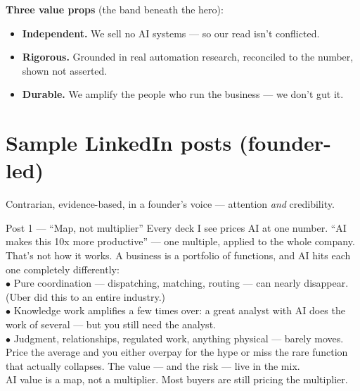 \documentclass[11pt]{article}
\begin{document}
\textbf{Three value props} (the band beneath the hero):
\begin{itemize}
  \item \textbf{Independent.} We sell no AI systems --- so our read isn't conflicted.
  \item \textbf{Rigorous.} Grounded in real automation research, reconciled to the number, shown not asserted.
  \item \textbf{Durable.} We amplify the people who run the business --- we don't gut it.
\end{itemize}

\section{Sample LinkedIn posts (founder-led)}
Contrarian, evidence-based, in a founder's voice --- attention \emph{and} credibility.

\begin{copybox}{Post 1 --- ``Map, not multiplier''}
Every deck I see prices AI at one number. ``AI makes this 10x more productive'' --- one multiple,
applied to the whole company.\\[3pt]
That's not how it works. A business is a portfolio of functions, and AI hits each one
completely differently:\\[2pt]
$\bullet$ Pure coordination --- dispatching, matching, routing --- can nearly disappear. (Uber
did this to an entire industry.)\\
$\bullet$ Knowledge work amplifies a few times over: a great analyst with AI does the work of
several --- but you still need the analyst.\\
$\bullet$ Judgment, relationships, regulated work, anything physical --- barely moves.\\[3pt]
Price the average and you either overpay for the hype or miss the rare function that actually
collapses. The value --- and the risk --- live in the mix.\\[3pt]
AI value is a map, not a multiplier. Most buyers are still pricing the multiplier.
\end{copybox}
\end{document}
